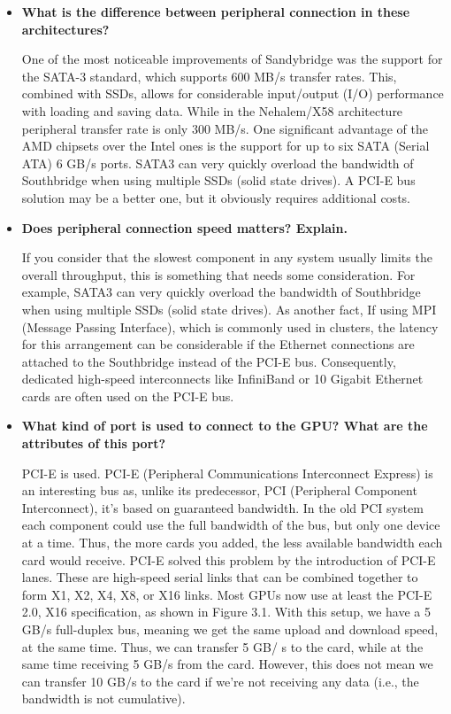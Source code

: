 \documentclass[12pt]{article}
\numberwithin{equation}{section}
\numberwithin{table}{section}
\numberwithin{figure}{section}
\begin{document}
\begin{itemize}
	\item \textbf{What is the difference between peripheral connection in these architectures?}

	One of the most noticeable improvements of Sandybridge was the support for the SATA-3 standard, which supports
	600 MB/s transfer rates. This, combined with SSDs, allows for considerable input/output (I/O)
	performance with loading and saving data. While in the Nehalem/X58 architecture peripheral transfer rate is only 300 MB/s. One significant advantage of the AMD chipsets over the Intel ones is the support for up to six SATA
	(Serial ATA) 6 GB/s ports. SATA3 can very
	quickly overload the bandwidth of Southbridge when using multiple SSDs (solid state drives). A PCI-E
	bus solution may be a better one, but it obviously requires additional costs. 
	
	\item \textbf{Does peripheral connection speed matters? Explain.}
	
	 If you consider that the slowest component in any system usually limits the overall throughput, this is something that needs some consideration. For example, SATA3 can very
	 quickly overload the bandwidth of Southbridge when using multiple SSDs (solid state drives). As another fact, If using MPI (Message Passing Interface), which is commonly used in clusters, the latency for this
	 arrangement can be considerable if the Ethernet connections are attached to the Southbridge instead
	 of the PCI-E bus. Consequently, dedicated high-speed interconnects like InfiniBand or 10 Gigabit
	 Ethernet cards are often used on the PCI-E bus.
	 
	\item \textbf{What kind of port is used to connect to the GPU? What are the attributes of this port?}
	
	PCI-E is used. PCI-E (Peripheral Communications Interconnect Express) is an interesting bus as, unlike its
	predecessor, PCI (Peripheral Component Interconnect), it’s based on guaranteed bandwidth. In the
	old PCI system each component could use the full bandwidth of the bus, but only one device at
	a time. Thus, the more cards you added, the less available bandwidth each card would receive. PCI-E
	solved this problem by the introduction of PCI-E lanes. These are high-speed serial links that can be
	combined together to form X1, X2, X4, X8, or X16 links. Most GPUs now use at least the PCI-E
	2.0, X16 specification, as shown in Figure 3.1. With this setup, we have a 5 GB/s full-duplex bus,
	meaning we get the same upload and download speed, at the same time. Thus, we can transfer 5 GB/
	s to the card, while at the same time receiving 5 GB/s from the card. However, this does not mean
	we can transfer 10 GB/s to the card if we’re not receiving any data (i.e., the bandwidth is not
	cumulative).
	

\end{itemize}
\end{document}
